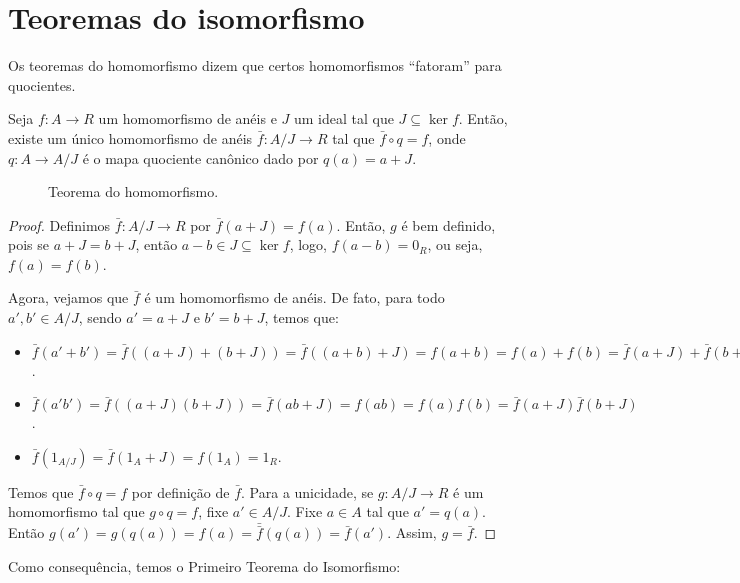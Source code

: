 \section{Teoremas do isomorfismo}
Os teoremas do homomorfismo dizem que certos homomorfismos ``fatoram'' para quocientes.
\begin{theorem}
    Seja $f:A\rightarrow R$ um homomorfismo de anéis e $J$ um ideal tal que $J\subseteq \ker f$. Então, existe um único homomorfismo de anéis $\bar f:A/J\rightarrow R$ tal que $\bar f\circ q=f$, onde $q:A\rightarrow A/J$ é o mapa quociente canônico dado por $q(a)=a+J$.
    \begin{figure}[h]\centering
        \caption{Teorema do homomorfismo.}
    \end{figure}
\end{theorem}
\begin{proof}
    Definimos $\bar f:A/J\rightarrow R$ por $\bar f(a+J)=f(a)$.
    Então, $g$ é bem definido, pois se $a+J=b+J$, então $a-b \in J\subseteq \ker f$, logo, $f(a-b)=0_R$, ou seja, $f(a)=f(b)$.

    Agora, vejamos que $\bar f$ é um homomorfismo de anéis.
    De fato, para todo $a', b' \in A/J$, sendo $a'=a+J$ e $b'=b+J$, temos que:
    \begin{itemize}
        \item $\bar f(a'+b')=\bar f((a+J)+(b+J))=\bar f((a+b)+J)=f(a+b)=f(a)+f(b)=\bar f(a+J)+\bar f(b+J)$.
        \item $\bar f(a'b')=\bar f((a+J)(b+J))=\bar f(ab+J)=f(ab)=f(a)f(b)=\bar f(a+J)\bar f(b+J)$.
        \item $\bar f(1_{A/J})=\bar f(1_A+J)=f(1_A)=1_R$.
    \end{itemize}

    Temos que $\bar f\circ q=f$ por definição de $\bar f$.
    Para a unicidade, se $g:A/J\rightarrow R$ é um homomorfismo tal que $g\circ q=f$, fixe $a'\in A/J$.
    Fixe $a \in A$ tal que $a'=q(a)$.
    Então $g(a')=g(q(a))=f(a)=\bar \bar f(q(a))=\bar f(a')$.
    Assim, $g=\bar f$.
\end{proof}

Como consequência, temos o Primeiro Teorema do Isomorfismo:

